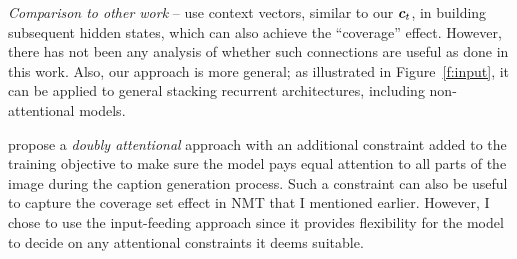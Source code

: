 {\it Comparison to other work} -- 
use context vectors, similar to
our $\mbox{\boldmath{$c$}}_{t}$, in building subsequent hidden states, which can also 
achieve the ``coverage'' effect. However, there has not been any analysis of 
whether such connections are useful as done in this work. Also,
our approach is more general; as illustrated in Figure~\ref{f:input}, it can be
applied to general stacking recurrent architectures, including non-attentional
models.

 propose a {\it doubly attentional} approach with an
additional constraint added to the training objective to make sure the model
pays equal attention to all parts of the image during the caption generation process. Such a constraint can also be useful to capture the coverage set effect in NMT that I mentioned earlier. However, I chose to use the input-feeding approach since it provides flexibility for the model to decide on any attentional constraints it deems suitable.
